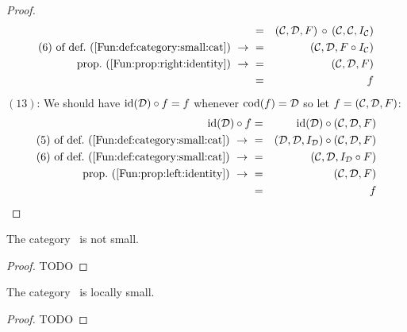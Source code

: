 \begin{proof}
\begin{eqnarray*}
            &=&(\Cat,\Dat,F)\,\circ\,(\Cat,\Cat,I_{\cal C})\\
            \mbox{$(6)$ of def.~(\ref{Fun:def:category:small:cat})}\ \to\ 
            &=&(\Cat,\Dat,F\circ I_{\cal C})\\
            \mbox{prop.~(\ref{Fun:prop:right:identity})}\ \to\ 
            &=&(\Cat,\Dat,F)\\
            &=&f
        \end{eqnarray*}
    $(13)$: We should have $\mbox{\rm id}(\mbox{$\cal D$})\circ f=f$ whenever $\mbox{\rm cod}(f)=\mbox{$\cal D$}$
    so let $f=(\mbox{$\cal C$},\mbox{$\cal D$},F)$:
        \begin{eqnarray*}\id(\Dat)\circ f
            &=&\id(\Dat)\circ(\Cat,\Dat,F)\\
            \mbox{$(5)$ of def.~(\ref{Fun:def:category:small:cat})}\ \to\ 
            &=&(\Dat,\Dat,I_{\cal D})\circ(\Cat,\Dat,F)\\
            \mbox{$(6)$ of def.~(\ref{Fun:def:category:small:cat})}\ \to\ 
            &=&(\Cat,\Dat,I_{\cal D}\circ F)\\
            \mbox{prop.~(\ref{Fun:prop:left:identity})}\ \to\ 
            &=&(\Cat,\Dat,F)\\
            &=&f
        \end{eqnarray*}
\end{proof}

\begin{prop}\label{Fun:prop:cat:not:small}
    The category \cat\ is not small.
\end{prop}
\begin{proof}
    TODO
\end{proof}

\begin{prop}\label{Fun:prop:cat:locally:small}
    The category \cat\ is locally small.
\end{prop}
\begin{proof}
    TODO
\end{proof}
